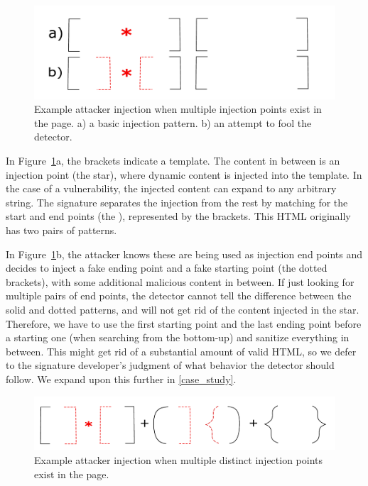\begin{figure}[h]
	\includegraphics[scale=0.25]{img/attacker_injection_compound.pdf}
	\caption{Example attacker injection when multiple injection points exist in the page. a) a basic injection pattern. b) an attempt to fool the detector.}
	\label{fig:attacker_injection}
\end{figure}

In Figure~\ref{fig:attacker_injection}a, the brackets indicate a
template. The content in between is an injection point (the star),
where dynamic content is injected into the template. In the case of a
vulnerability, the injected content can expand to any arbitrary
string. The signature separates the injection from the rest by
matching for the start and end points (the ),
represented by the brackets. This HTML originally has two pairs of
 patterns.

In Figure~\ref{fig:attacker_injection}b, the attacker knows these are
being used as injection end points and decides to inject a fake ending
point and a fake starting point (the dotted brackets), with some
additional malicious content in between. If just looking for multiple
pairs of end points, the detector cannot tell the difference between
the solid and dotted patterns, and will not get rid of the content
injected in the star. Therefore, we have to use the first starting
point and the last ending point before a starting one (when searching
from the bottom-up) and sanitize everything in between. This might get
rid of a substantial amount of valid HTML, so we defer to the
signature developer's judgment of what behavior the detector should
follow. We expand upon this further in \autoref{case_study}.


\begin{figure}[h]
	\includegraphics[scale=0.25]{img/attacker_injection_unique.pdf}
	\caption{Example attacker injection when multiple distinct injection points exist in the page.}
	\label{fig:attacker_injection_unique}
\end{figure}



